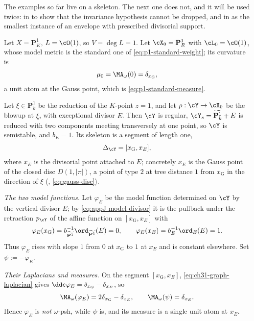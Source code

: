 The examples so far live on a skeleton.  The next one does not, and it will
be used twice: in  to show that the invariance
hypothesis cannot be dropped, and in  as the
smallest instance of an envelope with prescribed divisorial support.

\begin{example}
\label{ex:ch31-p1-blowup}
Let \(X=\mathbf P^1_K\), \(L=\cO(1)\), so \(V=\deg L=1\).  Let
\(\cX_0=\mathbf P^1_R\) with \(\cL_0=\cO(1)\), whose model metric is the
standard one of \eqref{eq:p1-standard-weight}; its curvature is
\begin{equation}
\label{eq:ch31-p1-reference}
 \mu_0=\MA_\omega(0)=\delta_{x_{\mathrm G}},
\end{equation}
a unit atom at the Gauss point, which is \eqref{eq:p1-standard-measure}.

Let \(\xi\in\mathbf P^1_k\) be the reduction of the \(K\)-point \(z=1\), and
let \(\rho:\cY\to\cX_0\) be the blowup at \(\xi\), with exceptional divisor
\(E\).  Then \(\cY\) is regular, \(\cY_s=\widetilde{\mathbf P^1_k}+E\) is
reduced with two components meeting transversely at one point, so \(\cY\) is
semistable, and \(b_E=1\).  Its skeleton is a segment of length one,
\[
 \Delta_{\cY}=[x_{\mathrm G},x_E],
\]
where \(x_E\) is the divisorial point attached to \(E\); concretely
\(x_E\) is the Gauss point of the closed disc
\(D(1,|\pi|)\), a point of type \(2\) at tree distance \(1\) from
\(x_{\mathrm G}\) in the direction of \(\xi\)
(, \eqref{eq:gauss-disc}).

\emph{The two model functions.}  Let \(\varphi_E\) be the model function
determined on \(\cY\) by the vertical divisor \(E\); by
\eqref{eq:appJ-model-divisor} it is the pullback under the retraction
\(p_{\cY}\) of the affine function on \([x_{\mathrm G},x_E]\) with
\[
 \varphi_E(x_{\mathrm G})=b_{\widetilde{\mathbf P^1}}^{-1}
   \ord_{\widetilde{\mathbf P^1}}(E)=0,
 \qquad
 \varphi_E(x_E)=b_E^{-1}\ord_E(E)=1 .
\]
Thus \(\varphi_E\) rises with slope \(1\) from \(0\) at \(x_{\mathrm G}\) to
\(1\) at \(x_E\) and is constant elsewhere.  Set \(\psi:=-\varphi_E\).

\emph{Their Laplacians and measures.}  On the segment
\([x_{\mathrm G},x_E]\), \eqref{eq:ch31-graph-laplacian} gives
\(\ddc\varphi_E=\delta_{x_{\mathrm G}}-\delta_{x_E}\), so
\begin{equation}
\label{eq:ch31-p1-two-measures}
 \MA_\omega(\varphi_E)=2\delta_{x_{\mathrm G}}-\delta_{x_E},
 \qquad
 \MA_\omega(\psi)=\delta_{x_E}.
\end{equation}
Hence \(\varphi_E\) is \emph{not} \(\omega\)-psh, while \(\psi\) is, and its
measure is a single unit atom at \(x_E\).


\end{example}
